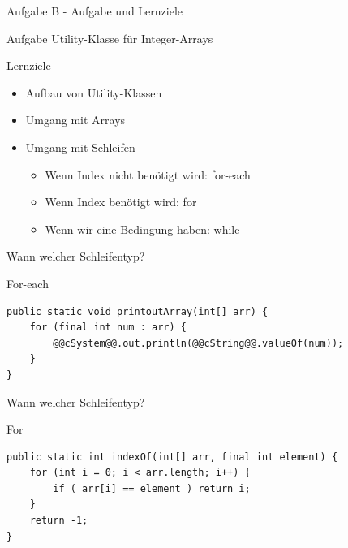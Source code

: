 \documentclass[aspectratio=169]{beamer}
\begin{document}
\begin{frame}{Aufgabe B - Aufgabe und Lernziele}
  \begin{block}{Aufgabe}
    \pause
    Utility-Klasse für Integer-Arrays
  \end{block}

  \pause
  \begin{block}{Lernziele}
    \begin{itemize}
      \item Aufbau von Utility-Klassen
      \pause
      \item Umgang mit Arrays
      \pause
      \item Umgang mit Schleifen \begin{itemize}
        \pause
        \item Wenn Index \color{alertcolor}nicht \color{FGround}benötigt wird: \color{keywordcolor}for-each\color{FGround}
        \pause
        \item Wenn Index benötigt wird: \color{keywordcolor}for\color{FGround}
        \pause
        \item Wenn wir eine Bedingung haben: \color{keywordcolor}while\color{FGround}
      \end{itemize}
    \end{itemize}
  \end{block}
\end{frame}

\begin{frame}[fragile]{Wann welcher Schleifentyp?}
  \begin{exampleblock}{For-each}
    \begin{lstlisting}
public static void printoutArray(int[] arr) {
    for (final int num : arr) {
        @@cSystem@@.out.println(@@cString@@.valueOf(num));
    }
}
    \end{lstlisting}
  \end{exampleblock}
\end{frame}

\begin{frame}[fragile]{Wann welcher Schleifentyp?}
  \begin{exampleblock}{For}
    \begin{lstlisting}
public static int indexOf(int[] arr, final int element) {
    for (int i = 0; i < arr.length; i++) {
        if ( arr[i] == element ) return i;
    }
    return -1;
}
    \end{lstlisting}
  \end{exampleblock}
\end{frame}
\end{document}
